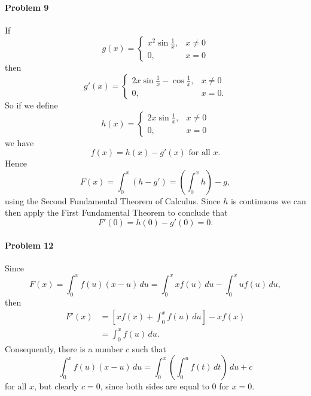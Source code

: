 \documentclass{article}
\begin{document}
\paragraph{Problem 9} If \[
  g(x) =
  \begin{cases}
    x^2 \sin \frac{1}{x}, &x \neq 0 \\
    0, &x = 0
  \end{cases}
\] then \[
  g'(x) =
  \begin{cases}
    2x \sin \frac{1}{x} - \cos \frac{1}{x}, &x \neq 0 \\
    0, &x = 0.
  \end{cases}
\] So if we define \[
  h(x) =
  \begin{cases}
    2x \sin \frac{1}{x}, &x \neq 0 \\
    0, &x = 0
  \end{cases}
\] we have \[
  f(x) = h(x) - g'(x) \text{ for all } x.
\] Hence \[
  F(x) = \int_0^x (h - g') = \left(\int_0^x h\right) - g,
\] using the Second Fundamental Theorem of Calculus. Since $h$ is continuous we
can then apply the First Fundamental Theorem to conclude that \[
  F'(0) = h(0) - g'(0) = 0.
\]

\paragraph{Problem 12} Since \[
  F(x) = \int_0^x f(u)(x - u) \,du = \int_0^x xf(u) \,du - \int_0^x uf(u) \,du,
\] then
\begin{align*}
  F'(x)
  &= \left[xf(x) + \int_0^x f(u) \,du\right] - xf(x) \\
  &= \int_0^x f(u) \,du.
\end{align*}
Consequently, there is a number $c$ such that \[
  \int_0^x f(u)(x - u) \,du
  = \int_0^x \left( \int_0^u f(t) \,dt \right) \,du + c
\] for all $x$, but clearly $c = 0$, since both sides are equal to 0 for $x =
0$.
\end{document}
